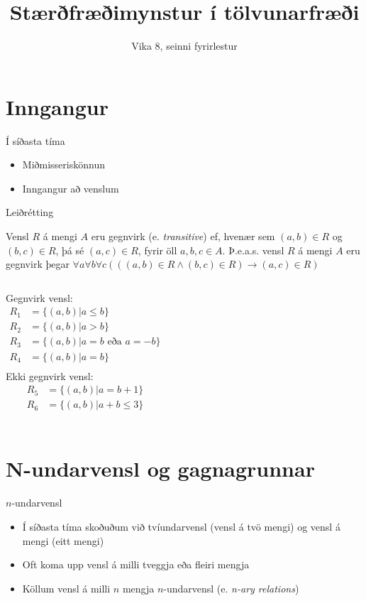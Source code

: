 \documentclass{beamer}
\title{Stærðfræðimynstur í tölvunarfræði}
\subtitle{Vika 8, seinni fyrirlestur}
\begin{document}
\begin{frame}
\titlepage
\end{frame}


\section{Inngangur}

\begin{frame}{Í síðasta tíma}
    \begin{itemize}
        \item Miðmisseriskönnun
        \item Inngangur að venslum
    \end{itemize}
\end{frame}

\begin{frame}[fragile]{Leiðrétting}

\begin{tcolorbox}[title={\color{red}Gegnvirk} vensl]
Vensl $R$ á mengi $A$ eru {\color{red}gegnvirk} (e. \emph{transitive}) ef, hvenær sem $(a, b) \in R$ og $(b, c) \in R$, þá sé $(a, c) \in R$, fyrir öll $a, b, c \in A$. Þ.e.a.s. vensl $R$ á mengi $A$ eru {\color{red}gegnvirk} þegar $\forall a\forall b\forall c(((a, b) \in R \land (b, c) \in R) \to (a, c) \in R)$
\end{tcolorbox}
\begin{columns}
Gegnvirk vensl:
\begin{align*}
R_1 &= \{(a, b)|a \leq b\}\\
R_2 &= \{(a, b)|a > b\}\\
R_3 &= \{(a, b)|a = b \text{ eða } a = -b\}\\
R_4 &= \{(a, b)|a = b\}\\
\end{align*}
Ekki gegnvirk vensl:
\begin{align*}
R_5 &= \{(a, b)|a = b+1\}\\
R_6 &= \{(a, b)|a+b \leq 3\}\\
\end{align*}
\end{columns}
\end{frame}

\section{N-undarvensl og gagnagrunnar}

\begin{frame}{$n$-undarvensl}
\begin{itemize}
 \item Í síðasta tíma skoðuðum við tvíundarvensl (vensl á tvö mengi) og vensl á mengi (eitt mengi)
 \item Oft koma upp vensl á milli tveggja eða fleiri mengja
 \item Köllum vensl á milli $n$ mengja $n$-undarvensl (e. \emph{n-ary relations})
\end{itemize}
\end{frame}
\end{document}
